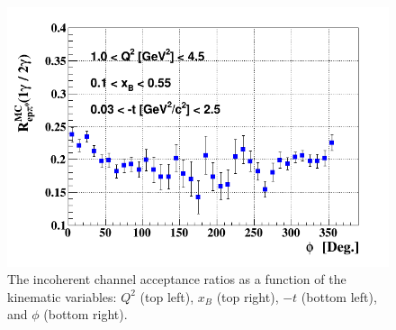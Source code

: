 \begin{figure}[tpb]
\includegraphics[scale=0.30]{fig_dvcs/epgamma_eppi0_Phi.png}
\caption{The incoherent channel acceptance ratios as a function of the 
kinematic variables: $Q^{2}$ (top left), $x_{B}$ (top right), $-t$ (bottom 
left), and $\phi$ (bottom right).}
\label{fig:incoh_acceptance _ratios}
\end{figure}


